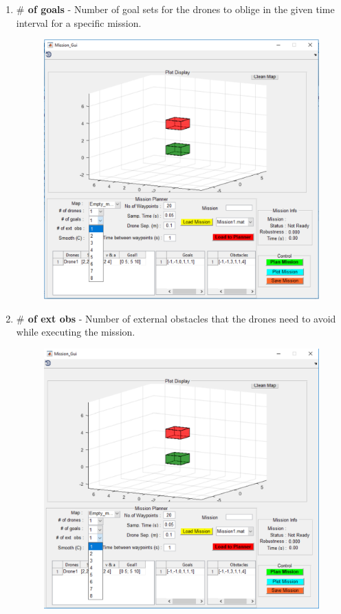 \documentclass[english]{article}
\begin{document}
\begin{enumerate}
\begin{figure}[H]
    \end{figure}
    \item \textbf{$\#$ of goals} - Number of goal sets for the drones to oblige in the given time interval for a specific mission.
    \begin{figure}[H]
        \centering
        \includegraphics[scale=0.4]{goals.pdf}
    \end{figure}
    \item \textbf{$\#$ of ext obs} - Number of external obstacles that the drones need to avoid while executing the mission.
    \begin{figure}[H]
        \centering
        \includegraphics[scale=0.5]{obs.pdf}

\end{figure}
\end{enumerate}
\end{document}
